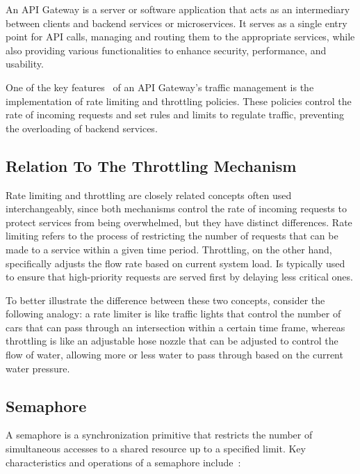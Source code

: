 An API Gateway is a server or software application that acts as an intermediary between clients and backend services or microservices.
It serves as a single entry point for API calls, managing and routing them to the appropriate services, while also providing various functionalities to enhance security, performance, and usability.

One of the key features~\cite{api-gateway} of an API Gateway's traffic management is the implementation of rate limiting and throttling policies.
These policies control the rate of incoming requests and set rules and limits to regulate traffic, preventing the overloading of backend services.

\subsection{Relation To The Throttling Mechanism}\label{subsec:rate-limiter-throttling}

Rate limiting and throttling are closely related concepts often used interchangeably,
since both mechanisms control the rate of incoming requests to protect services from being overwhelmed, but they have distinct differences.
Rate limiting refers to the process of restricting the number of requests that can be made to a service within a given time period.
Throttling, on the other hand,
specifically adjusts the flow rate based on current system load.
Is typically used to ensure that high-priority requests are served first by delaying less critical ones.

To better illustrate the difference between these two concepts, consider the following analogy:
a rate limiter is like traffic lights that control the number of cars that can pass through an intersection within a certain time frame,
whereas throttling is like an adjustable hose nozzle that can be adjusted to control the flow of water, allowing more or less water to pass through based on the current water pressure.

\subsection{Semaphore}\label{subsec:rate-limiter-semaphore}

A semaphore is a synchronization primitive that restricts the number of simultaneous accesses to a shared resource
up to a specified limit.
Key characteristics and operations of a semaphore include~\cite{java-semaphore, oracle-multithreaded-programming-guide}:

